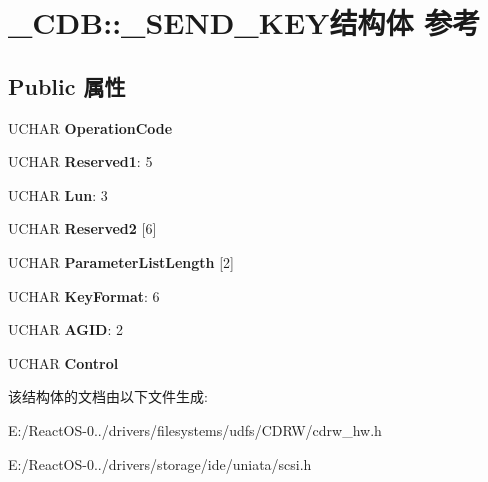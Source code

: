 \hypertarget{struct___c_d_b_1_1___s_e_n_d___k_e_y}{}\section{\+\_\+\+C\+DB\+:\+:\+\_\+\+S\+E\+N\+D\+\_\+\+K\+E\+Y结构体 参考}
\label{struct___c_d_b_1_1___s_e_n_d___k_e_y}
\subsection*{Public 属性}
\begin{DoxyCompactItemize}
\item 
\mbox{\label{struct___c_d_b_1_1___s_e_n_d___k_e_y_a7f9cc80a5f80657157d3ddad806bb271}} 
U\+C\+H\+AR {\bfseries Operation\+Code}
\item 
\mbox{\label{struct___c_d_b_1_1___s_e_n_d___k_e_y_a64479fbbcca32c6f4ffdf013d0987d92}} 
U\+C\+H\+AR {\bfseries Reserved1}\+: 5
\item 
\mbox{\label{struct___c_d_b_1_1___s_e_n_d___k_e_y_a568d3ef068faf0070a326b57cb6a6162}} 
U\+C\+H\+AR {\bfseries Lun}\+: 3
\item 
\mbox{\label{struct___c_d_b_1_1___s_e_n_d___k_e_y_a198136626f796eeb0087f2b4be6cd0ff}} 
U\+C\+H\+AR {\bfseries Reserved2} \mbox{[}6\mbox{]}
\item 
\mbox{\label{struct___c_d_b_1_1___s_e_n_d___k_e_y_a87a145db1db2b0c90b8e6f436aea74fa}} 
U\+C\+H\+AR {\bfseries Parameter\+List\+Length} \mbox{[}2\mbox{]}
\item 
\mbox{\label{struct___c_d_b_1_1___s_e_n_d___k_e_y_a61c1610638aeae2a668e52e1f395df4d}} 
U\+C\+H\+AR {\bfseries Key\+Format}\+: 6
\item 
\mbox{\label{struct___c_d_b_1_1___s_e_n_d___k_e_y_afb29f8fae0c5147a7711c754a8fe89a6}} 
U\+C\+H\+AR {\bfseries A\+G\+ID}\+: 2
\item 
\mbox{\label{struct___c_d_b_1_1___s_e_n_d___k_e_y_a97ed1829133a102adc5b240ff68a59ed}} 
U\+C\+H\+AR {\bfseries Control}
\end{DoxyCompactItemize}


该结构体的文档由以下文件生成\+:\begin{DoxyCompactItemize}
\item 
E\+:/\+React\+O\+S-\/0../drivers/filesystems/udfs/\+C\+D\+R\+W/cdrw\+\_\+hw.\+h\item 
E\+:/\+React\+O\+S-\/0../drivers/storage/ide/uniata/scsi.\+h\end{DoxyCompactItemize}
